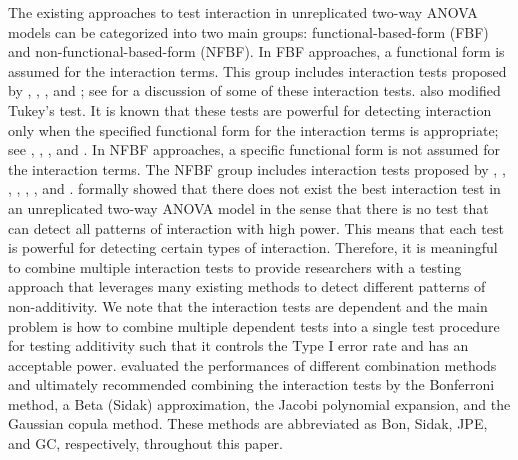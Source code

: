The existing approaches to test interaction in unreplicated two-way ANOVA models can be categorized into two main groups: functional-based-form (FBF) and non-functional-based-form (NFBF). In FBF approaches, a functional form is assumed for the interaction terms. This group includes interaction tests proposed by \citet{Tukey:1949}, \citet{Mandel:1961,  Mandel:1971}, \citet{JG:1972}, and \citet{CE:1972, CE:1974}; see \citet[pp 2--63]{MJ:1989} for a discussion of some of these interaction tests. \citet{SS:2013} also modified Tukey's test. It is known that these tests are powerful for detecting interaction only when the specified functional form for the interaction terms is appropriate; see \citet{Boik:1993}, \citet{AK:2006}, \citet{SS:2013}, and \citet{SKK:2018}. In NFBF approaches, a specific functional form is not assumed for the interaction terms. The NFBF group includes interaction tests proposed by \citet{MR:1977}, \citet{Tusell:1990}, \citet{Boik:1993}, \citet{Piepho:1994}, \citet{KKSA:2007}, \citet{Franck:2013}, \citet{Malik:2016} and \citet{KKM:2016}. \citet{KKSA:2007} formally showed that there does not exist the best interaction test in an unreplicated two-way ANOVA model in the sense that there is no test that can detect all patterns of interaction with high power. This means that {each test is powerful for detecting certain types of interaction}. Therefore, it is meaningful to combine multiple interaction tests to provide researchers with a testing approach that leverages many existing methods to detect different patterns of non-additivity. We note that the interaction tests are dependent and the main problem is how to combine multiple dependent tests into a single test procedure for testing additivity such that it controls the {Type I error} rate and has an acceptable power. \citet{SKK:2018} evaluated the performances of different combination methods and ultimately recommended combining the interaction tests by the Bonferroni method, a Beta (Sidak) approximation, the Jacobi polynomial expansion, and the Gaussian copula method. These methods are abbreviated as Bon, Sidak, JPE, and GC, respectively, throughout this paper.

